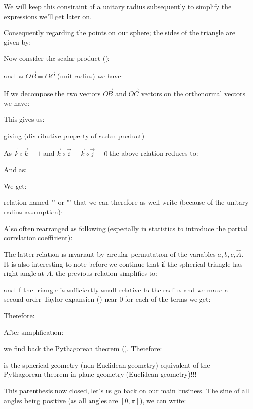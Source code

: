 	We will keep this constraint of a unitary radius subsequently to simplify the expressions we'll get later on.
	
	Consequently regarding the points on our sphere; the sides of the triangle are given by:
	
	Now consider the scalar product ():
	
	and as $\overrightarrow{OB}= \overrightarrow{OC}$ (unit radius) we have:
	
	If we decompose the two vectors $\overrightarrow{OB}$ and $\overrightarrow{OC}$ vectors on the orthonormal vectors we have:
	
	This gives us:
	
	giving (distributive property of scalar product):
	
	As $\vec{k}\circ \vec{k}=1$ and $\vec{k}\circ \vec{i}=\vec{k}\circ \vec{j}=0$ the above relation reduces to:
	
	And as:
	
	We get:
	
	relation named "" or "\label{cosine formula}" that we can therefore as well write (because of the unitary radius assumption):
	
	Also often rearranged as following (especially in statistics to introduce the partial correlation coefficient):
	
	The latter relation is invariant by circular permutation of the variables $a,b,c,\hat{A}$. It is also interesting to note before we continue that if the spherical triangle has right angle at $A$, the previous relation simplifies to:
	
	and if the triangle is sufficiently small relative to the radius and we make a second order Taylor expansion () near $0$  for each of the terms we get:
	
	Therefore:
	
	After simplification:
	
	we find back the Pythagorean theorem (). Therefore:
	
	is the spherical geometry (non-Euclidean geometry) equivalent  of the Pythagorean theorem in plane geometry (Euclidean geometry)!!!
	
	This  parenthesis now closed, let's us go back on our main business. The sine of all angles being positive (as all angles are $[0,\pi]$), we can write:
	
